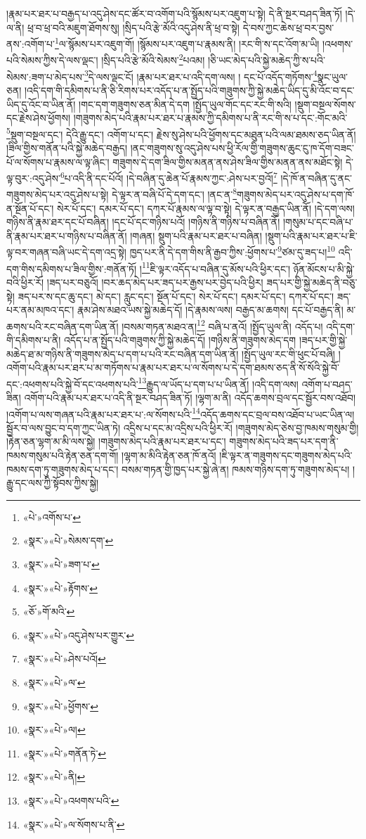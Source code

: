 །རྣམ་པར་ཐར་པ་བརྒྱད་པ་འདུ་ཤེས་དང་ཚོར་བ་འགོག་པའི་སྙོམས་པར་འཇུག་པ་སྟེ། དེ་ནི་སྔར་བཤད་ཟིན་ཏོ། །དེ་ལ་ནི། ཕྲ་བ་ཕྲ་བའི་མཇུག་ཐོགས་སུ། །སྲིད་པའི་རྩེ་མོའི་འདུ་ཤེས་ནི་ཕྲ་བ་སྟེ། དེ་བས་ཀྱང་ཆེས་ཕྲ་བར་བྱས་ནས་:འགོག་པ་\footnote{«པེ་»འགོས་པ་}ལ་སྙོམས་པར་འཇུག་གོ། །སྙོམས་པར་འཇུག་པ་རྣམས་ནི། །རང་གི་ས་དང་འོག་མ་ཡི། །འཕགས་པའི་སེམས་ཀྱིས་དེ་ལས་ལྡང་། །སྲིད་པའི་རྩེ་མོའི་སེམས་\footnote{«སྣར་»«པེ་»སེམས་དག་}པའམ། །ཅི་ཡང་མེད་པའི་སྐྱེ་མཆེད་ཀྱི་ས་པའི་སེམས་:ཟག་པ་མེད་པས་\footnote{«སྣར་»«པེ་»ཟག་པ་}དེ་ལས་ལྡང་ངོ། །རྣམ་པར་ཐར་པ་འདི་དག་ལས། །
དང་པོ་འདོད་གཏོགས་\footnote{«སྣར་»«པེ་»རྟོགས་}སྣང་ཡུལ་ཅན། །འདི་དག་གི་དམིགས་པ་ནི་ཅི་རིགས་པར་འདོད་པ་ན་སྤྱོད་པའི་གཟུགས་ཀྱི་སྐྱེ་མཆེད་ཡིད་དུ་མི་འོང་བ་དང་ཡིད་དུ་འོང་བ་ཡིན་ནོ། །གང་དག་གཟུགས་ཅན་མིན་དེ་དག །སྤྱོད་ཡུལ་གོང་དང་རང་གི་སའི། །སྡུག་བསྔལ་སོགས་དང་རྗེས་ཤེས་ཕྱོགས། །གཟུགས་མེད་པའི་རྣམ་པར་ཐར་པ་རྣམས་ཀྱི་དམིགས་པ་ནི་རང་གི་ས་པ་དང་:གོང་མའི་\footnote{«ཅོ་»གོ་མའི་}སྡུག་བསྔལ་དང་། དེའི་རྒྱུ་དང་། འགོག་པ་དང་། རྗེས་སུ་ཤེས་པའི་ཕྱོགས་དང་མཐུན་པའི་ལམ་ཐམས་ཅད་ཡིན་ནོ། །ཟིལ་གྱིས་གནོན་པའི་སྐྱེ་མཆེད་བརྒྱད། །ནང་གཟུགས་སུ་འདུ་ཤེས་པས་ཕྱི་རོལ་གྱི་གཟུགས་ཆུང་ངུ་ཁ་དོག་བཟང་པོ་ལ་སོགས་པ་རྣམས་ལ་ལྟ་ཞིང་། གཟུགས་དེ་དག་ཟིལ་གྱིས་མནན་ནས་ཤེས་ཟིལ་གྱིས་མནན་ནས་མཐོང་སྟེ། དེ་ལྟ་བུར་:འདུ་ཤེས་\footnote{«སྣར་»«པེ་»འདུ་ཤེས་པར་གྱུར་}པ་འདི་ནི་དང་པོའོ། །དེ་བཞིན་དུ་ཆེན་པོ་རྣམས་ཀྱང་:ཤེས་པར་བྱའོ།\footnote{«སྣར་»«པེ་»ཤེས་པའོ།} །དེ་ཁོ་ན་བཞིན་དུ་ནང་གཟུགས་མེད་པར་འདུ་ཤེས་པ་སྟེ། དེ་ལྟར་ན་བཞི་པོ་དེ་དག་དང་། །ནང་ན་\footnote{«སྣར་»«པེ་»ལ་}གཟུགས་མེད་པར་འདུ་ཤེས་པ་དག་ཁོ་ན་སྔོན་པོ་དང་། སེར་པོ་དང་། དམར་པོ་དང་། དཀར་པོ་རྣམས་ལ་ལྟ་བ་སྟེ། དེ་ལྟར་ན་བརྒྱད་ཡིན་ནོ། །དེ་དག་ལས། གཉིས་ནི་རྣམ་ཐར་དང་པོ་བཞིན། །དང་པོ་དང་གཉིས་པའོ། །གཉིས་ནི་གཉིས་པ་བཞིན་ནོ། །གསུམ་པ་དང་བཞི་པ་ནི་རྣམ་པར་ཐར་པ་གཉིས་པ་བཞིན་ནོ། །གཞན། སྡུག་པའི་རྣམ་པར་ཐར་པ་བཞིན། །སྡུག་པའི་རྣམ་པར་ཐར་པ་ཇི་ལྟ་བར་གཞན་བཞི་ཡང་དེ་དག་འདྲ་སྟེ། ཁྱད་པར་ནི་དེ་དག་གིས་ནི་རྒྱབ་ཀྱིས་:ཕྱོགས་པ་\footnote{«སྣར་»«པེ་»ཕྱོགས་}ཙམ་དུ་ཟད་པ།\footnote{«སྣར་»«པེ་»ལ།} འདི་དག་གིས་དམིགས་པ་ཟིལ་གྱིས་:གནོན་ཏོ། །\footnote{«སྣར་»«པེ་»གནོན་ཏེ་}ཇི་ལྟར་འདོད་པ་བཞིན་དུ་མོས་པའི་ཕྱིར་དང་། ཉོན་མོངས་པ་མི་སྐྱེ་བའི་ཕྱིར་རོ། །ཟད་པར་བཅུའོ། །བར་ཆད་མེད་པར་ཟད་པར་རྒྱས་པར་བྱེད་པའི་ཕྱིར། ཟད་པར་གྱི་སྐྱེ་མཆེད་ནི་བཅུ་སྟེ། ཟད་པར་ས་དང་ཆུ་དང་། མེ་དང་། རླུང་དང་། སྔོན་པོ་དང་། སེར་པོ་དང་། དམར་པོ་དང་། དཀར་པོ་དང་། ཟད་པར་ནམ་མཁའ་དང་། རྣམ་ཤེས་མཐའ་ཡས་སྐྱེ་མཆེད་དོ། །དེ་རྣམས་ལས། བརྒྱད་མ་ཆགས། དང་པོ་བརྒྱད་ནི། མ་ཆགས་པའི་རང་བཞིན་དག་ཡིན་ནོ། །བསམ་གཏན་མཐའ་ན།\footnote{«སྣར་»«པེ་»ནི།} བཞི་པ་ནའོ། །སྤྱོད་ཡུལ་ནི། འདོད་པ། འདི་དག་གི་དམིགས་པ་ནི། འདོད་པ་ན་སྤྱོད་པའི་གཟུགས་ཀྱི་སྐྱེ་མཆེད་དོ། །གཉིས་ནི་གཟུགས་མེད་དག །ཟད་པར་གྱི་སྐྱེ་མཆེད་ཐ་མ་གཉིས་ནི་གཟུགས་མེད་པ་དག་པ་པའི་རང་བཞིན་དག་ཡིན་ནོ། །སྤྱོད་ཡུལ་རང་གི་ཕུང་པོ་བཞི། །འགོག་པའི་རྣམ་པར་ཐར་པ་མ་གཏོགས་པ་རྣམ་པར་ཐར་པ་ལ་སོགས་པ་དེ་དག་ཐམས་ཅད་ནི་སོ་སོའི་སྐྱེ་བོ་དང་:འཕགས་པའི་སྐྱེ་བོ་དང་འཕགས་པའི་\footnote{«སྣར་»«པེ་»འཕགས་པའི་}རྒྱུད་ལ་ཡོད་པ་དག་པ་པ་ཡིན་ནོ། །འདི་དག་ལས། འགོག་པ་བཤད་ཟིན། འགོག་པའི་རྣམ་པར་ཐར་པ་འདི་ནི་སྔར་བཤད་ཟིན་ཏོ། །ལྷག་མ་ནི། འདོད་ཆགས་བྲལ་དང་སྦྱོར་བས་འཐོབ། །འགོག་པ་ལས་གཞན་པའི་རྣམ་པར་ཐར་པ་:ལ་སོགས་པའི་\footnote{«སྣར་»«པེ་»ལ་སོགས་པ་ནི་}འདོད་ཆགས་དང་བྲལ་བས་འཐོབ་པ་ཡང་ཡིན་ལ། སྦྱོར་བ་ལས་བྱུང་བ་དག་ཀྱང་ཡིན་ཏེ། འདྲིས་པ་དང་མ་འདྲིས་པའི་ཕྱིར་རོ། །གཟུགས་མེད་ཅེས་བྱ་ཁམས་གསུམ་གྱི། །རྟེན་ཅན་ལྷག་མ་མི་ལས་སྐྱེ། །གཟུགས་མེད་པའི་རྣམ་པར་ཐར་པ་དང་། གཟུགས་མེད་པའི་ཟད་པར་དག་ནི་ཁམས་གསུམ་པའི་རྟེན་ཅན་དག་གོ། །ལྷག་མ་མིའི་རྟེན་ཅན་ཁོ་ནའོ། །ཇི་ལྟར་ན་གཟུགས་དང་གཟུགས་མེད་པའི་ཁམས་དག་ཏུ་གཟུགས་མེད་པ་དང་། བསམ་གཏན་གྱི་ཁྱད་པར་སྐྱེ་ཞེ་ན། ཁམས་གཉིས་དག་ཏུ་གཟུགས་མེད་པ། །རྒྱུ་དང་ལས་ཀྱི་སྟོབས་ཀྱིས་སྐྱེ། 